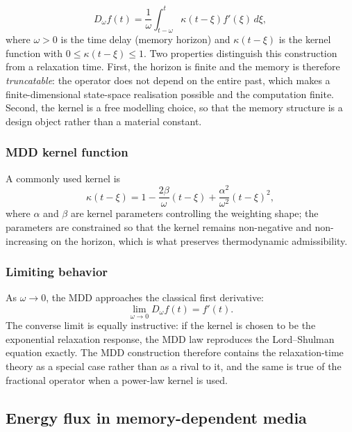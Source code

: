 \begin{equation}
D_\omega f(t) = \frac{1}{\omega}\int_{t-\omega}^{t} \kappa(t-\xi) f'(\xi)\,d\xi,
\label{eq:6.7}
\end{equation}
where $\omega > 0$ is the time delay (memory horizon) and $\kappa(t-\xi)$ is the kernel function with $0 \leq \kappa(t-\xi) \leq 1$. Two properties distinguish this construction from a relaxation time. First, the horizon is finite and the memory is therefore \emph{truncatable}: the operator does not depend on the entire past, which makes a finite-dimensional state-space realisation possible and the computation finite. Second, the kernel is a free modelling choice, so that the memory structure is a design object rather than a material constant.

\subsubsection{MDD kernel function}

A commonly used kernel is
\begin{equation}
\kappa(t-\xi) = 1 - \frac{2\beta}{\omega}(t-\xi) + \frac{\alpha^2}{\omega^2}(t-\xi)^2,
\label{eq:6.8}
\end{equation}
where $\alpha$ and $\beta$ are kernel parameters controlling the weighting shape; the parameters are constrained so that the kernel remains non-negative and non-increasing on the horizon, which is what preserves thermodynamic admissibility.

\subsubsection{Limiting behavior}

As $\omega \to 0$, the MDD approaches the classical first derivative:
\begin{equation}
\lim_{\omega \to 0} D_\omega f(t) = f'(t).
\label{eq:6.9}
\end{equation}
The converse limit is equally instructive: if the kernel is chosen to be the exponential relaxation response, the MDD law reproduces the Lord--Shulman equation exactly. The MDD construction therefore contains the relaxation-time theory as a special case rather than as a rival to it, and the same is true of the fractional operator when a power-law kernel is used.

\subsection{Energy flux in memory-dependent media}
\label{sec:6.5}

